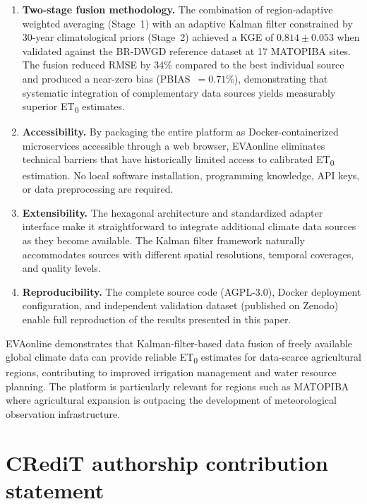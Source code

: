 \documentclass[preprint,review,12pt]{elsarticle}
\begin{document}
\begin{enumerate}
\item \textbf{Two-stage fusion methodology.} The combination of region-adaptive
weighted averaging (Stage~1) with an adaptive Kalman filter constrained by
30-year climatological priors (Stage~2) achieved a KGE of $0.814 \pm 0.053$
when validated against the BR-DWGD reference dataset at 17 MATOPIBA sites.
The fusion reduced RMSE by 34\% compared to the best individual source and
produced a near-zero bias (PBIAS~$= 0.71\%$), demonstrating that systematic
integration of complementary data sources yields measurably superior
ET\textsubscript{0} estimates.

\item \textbf{Accessibility.} By packaging the entire platform as
Docker-containerized microservices accessible through a web browser, EVAonline
eliminates technical barriers that have historically limited access to
calibrated ET\textsubscript{0} estimation. No local software installation,
programming knowledge, API keys, or data preprocessing are required.

\item \textbf{Extensibility.} The hexagonal architecture and standardized
adapter interface make it straightforward to integrate additional climate data
sources as they become available. The Kalman filter framework naturally
accommodates sources with different spatial resolutions, temporal coverages,
and quality levels.

\item \textbf{Reproducibility.} The complete source code (AGPL-3.0), Docker
deployment configuration, and independent validation dataset (published on
Zenodo) enable full reproduction of the results presented in this paper.
\end{enumerate}

EVAonline demonstrates that Kalman-filter-based data fusion of freely available
global climate data can provide reliable ET\textsubscript{0} estimates for
data-scarce agricultural regions, contributing to improved irrigation management
and water resource planning. The platform is particularly relevant for regions
such as MATOPIBA where agricultural expansion is outpacing the development of
meteorological observation infrastructure.



\section*{CRediT authorship contribution statement}
\label{sec:credit_authorship}
\end{document}
